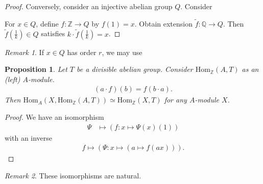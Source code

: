 \documentclass[12pt]{report}
\theoremstyle{plain}
\newtheorem{proposition}[theorem]{Proposition}
\theoremstyle{remark}
\newtheorem*{remark}{Remark}
\theoremstyle{definition}
\newcommand{\Z}{\mathbb{Z}}
\newcommand{\Q}{\mathbb{Q}}
\newcommand{\Hom}[3]{\mathrm{Hom}_{#3}(#1,#2)}
\begin{document}
\begin{proof}
    Conversely, consider an injective abelian group $Q$. Consider
    \begin{figure}[H]
        \centering
    \end{figure}
    \noindent For $x\in Q$, define $f:\Z\rightarrow Q$ by $f(1)=x$. Obtain extension $\tilde{f}:\Q\rightarrow Q$. Then $\tilde{f}(\frac{1}{k})\in Q$ satisfies $k\cdot \tilde{f}(\frac{1}{k})=x$.
\end{proof}
\begin{remark}
    If $x\in Q$ has order $r$, we may use
    \begin{figure}[H]
        \centering
    \end{figure}
\end{remark}

\begin{proposition}
    Let $T$ be a divisible abelian group. Consider $\Hom{A}{T}{\Z}$ as an (left) $A$-module.
    \begin{align*}
        (a\cdot f)(b) = f(b\cdot a).
    \end{align*}
    Then $\Hom{X}{\Hom{A}{T}{\Z}}{A}\simeq \Hom{X}{T}{\Z}$ for any $A$-module $X$.
\end{proposition}
\begin{proof}
    We have an isomorphism
    \begin{align*}
        \Psi &\mapsto \left(f:x\mapsto \Psi(x)(1) \right)
    \end{align*}
    with an inverse
    \begin{align*}
        f \mapsto \left( \Psi: x\mapsto (a\mapsto f(ax))\right).
    \end{align*}
\end{proof}
\begin{remark}
    These isomorphisms are natural.
\end{remark}
\end{document}

